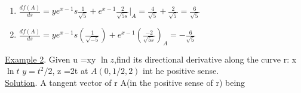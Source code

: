 \documentclass[11pt]{amsbook}
\begin{document}

 \begin{enumerate}[label=\alph*)]


 \item 

$\frac{df(A)}{ds} = y e^{x-1}s \frac{1}{\sqrt{5}} + e^{x-1} \frac{2}{\sqrt{5s}} \rvert_A = \frac{4}{\sqrt{5}} + \frac{2}{\sqrt{5}} = \frac{6}{\sqrt{5}}$


\item 
$\frac{df(A)}{ds} = y e^{x-1}s (\frac{1}{\sqrt{-5}}) + e^{x-1} (\frac{-2}{\sqrt{5s}}) _A =   -\frac{6}{\sqrt{5}} $



\end{enumerate}
\hspace*{6ex}\underline{Example 2}. Given u =xy $\ln z $,find its directional derivative along the curve r: x $\ln t $ $y=t^2/2$, z =2t at $A(0, 1/2, 2)$ int he positive sense.\\
\hspace*{6ex}\underline{Solution}. A tangent vector of r A(in the positive sense of r) being
\end{document}
